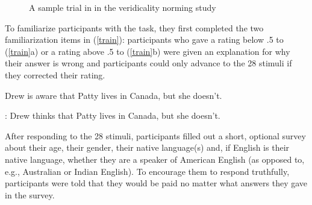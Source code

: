\documentclass[11pt,fleqn]{article}
\newcommand{\6}{\mbox{$[\hspace*{-.6mm}[$}}
\newcommand{\9}{\mbox{$]\hspace*{-.6mm}]$}}
\begin{document}
\begin{figure}[h!]
\begin{center}
\end{center}
\caption{A sample trial in in the veridicality norming study}\label{f-trial-exp2}
\end{figure}

To familiarize participants with the task, they first completed the two familiarization items in (\ref{train}): participants who gave a rating below .5 to (\ref{train}a) or a rating above .5 to (\ref{train}b) were given an explanation for why their answer is wrong and participants could only advance to the 28 stimuli if they corrected their rating. 

\begin{exe}
\ex\label{train}
\begin{xlist}
 Drew is aware that Patty lives in Canada, but she doesn't.

: Drew thinks that Patty lives in Canada, but she doesn't.
\end{xlist}
\end{exe}

After responding to the 28 stimuli, participants filled out a short, optional survey about their age, their gender, their native language(s) and, if English is their native language, whether they are a speaker of American English (as opposed to, e.g., Australian or Indian English). To encourage them to respond truthfully, participants were told that they would be paid no matter what answers they gave in the survey.
\end{document}
